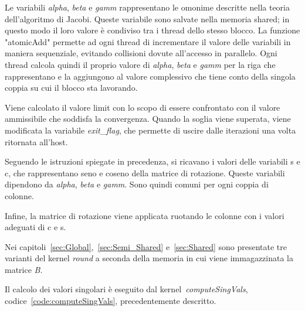 Le variabili \textit{alpha}, \textit{beta} e \textit{gamm} rappresentano le omonime descritte nella teoria dell'algoritmo di Jacobi. Queste variabile sono salvate nella memoria shared; in questo modo il loro valore è condiviso tra i thread dello stesso blocco. La funzione "atomicAdd" permette ad ogni thread di incrementare il valore delle variabili in maniera sequenziale, evitando collisioni dovute all'accesso in parallelo.
Ogni thread calcola quindi il proprio valore di \textit{alpha}, \textit{beta} e \textit{gamm} per la riga che rappresentano e la aggiungono al valore complessivo che tiene conto della singola coppia su cui il blocco sta lavorando.

Viene calcolato il valore limit con lo scopo di essere confrontato con il valore ammissibile che soddisfa la convergenza. Quando la soglia viene superata, viene modificata la variabile \textit{exit\_flag}, che permette di uscire dalle iterazioni una volta ritornata all'host.

Seguendo le istruzioni spiegate in precedenza, si ricavano i valori delle variabili s e c, che rappresentano seno e coseno della matrice di rotazione. Queste variabili dipendono da \textit{alpha}, \textit{beta} e \textit{gamm}. Sono quindi comuni per ogni coppia di colonne.

Infine, la matrice di rotazione viene applicata ruotando le colonne con i valori adeguati di c e s.

Nei capitoli~\ref{sec:Global},~\ref{sec:Semi_Shared} e~\ref{sec:Shared} sono presentate tre varianti del kernel \textit{round} a seconda della memoria in cui viene immagazzinata la matrice \textit{B}.

Il calcolo dei valori singolari è eseguito dal kernel~\textit{computeSingVals}, codice~\ref{code:computeSingVals}, precedentemente descritto.